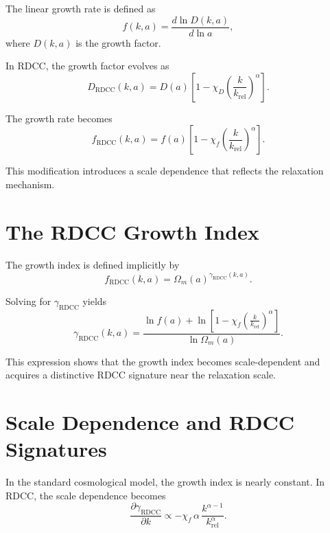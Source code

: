 \documentclass[11pt,a4paper]{article}
\begin{document}
The linear growth rate is defined as
\begin{equation}
    f(k,a)
    = \frac{d\ln D(k,a)}{d\ln a},
\end{equation}
where $D(k,a)$ is the growth factor.

In RDCC, the growth factor evolves as
\begin{equation}
    D_{\mathrm{RDCC}}(k,a)
    = D(a)
      \left[
        1 - \chi_{D}
        \left(\frac{k}{k_{\mathrm{rel}}}\right)^{\alpha}
      \right].
\end{equation}

The growth rate becomes
\begin{equation}
    f_{\mathrm{RDCC}}(k,a)
    = f(a)
      \left[
        1 - \chi_{f}
        \left(\frac{k}{k_{\mathrm{rel}}}\right)^{\alpha}
      \right].
\end{equation}

This modification introduces a scale dependence that reflects the relaxation 
mechanism.
\section{The RDCC Growth Index}

The growth index is defined implicitly by
\begin{equation}
    f_{\mathrm{RDCC}}(k,a)
    = \Omega_{m}(a)^{\gamma_{\mathrm{RDCC}}(k,a)}.
\end{equation}

Solving for $\gamma_{\mathrm{RDCC}}$ yields
\begin{equation}
    \gamma_{\mathrm{RDCC}}(k,a)
    = \frac{
        \ln f(a)
        + \ln\left[
            1 - \chi_{f}
            \left(\frac{k}{k_{\mathrm{rel}}}\right)^{\alpha}
        \right]
    }{
        \ln \Omega_{m}(a)
    }.
\end{equation}

This expression shows that the growth index becomes scale-dependent and acquires a 
distinctive RDCC signature near the relaxation scale.
\section{Scale Dependence and RDCC Signatures}

In the standard cosmological model, the growth index is nearly constant. In RDCC, 
the scale dependence becomes
\begin{equation}
    \frac{\partial \gamma_{\mathrm{RDCC}}}{\partial k}
    \propto
    -\chi_{f}\,\alpha\,
    \frac{k^{\alpha - 1}}{k_{\mathrm{rel}}^{\alpha}}.
\end{equation}
\end{document}

